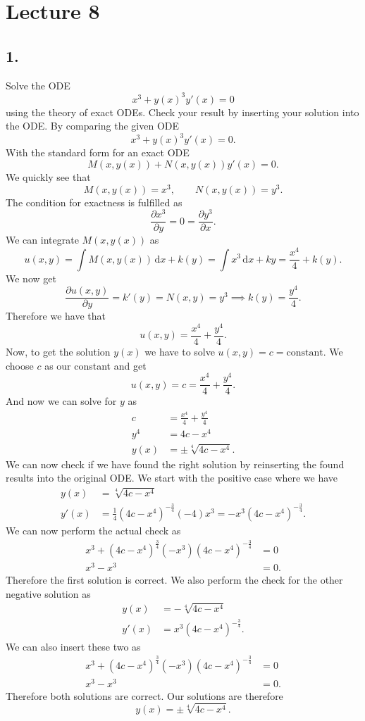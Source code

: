 \section*{Lecture 8}

\subsection*{1.} Solve the ODE
\[ 
x^3 + y(x)^3y'(x) = 0
\]
using the theory of exact ODEs. Check your result by inserting your solution into the ODE.
\bigbreak
By comparing the given ODE
\[ 
x^3 + y(x)^3 y'(x) = 0
.\]
With the standard form for an exact ODE
\[ 
M(x, y(x)) + N(x, y(x))y'(x) = 0
.\]
We quickly see that
\[ 
M(x, y(x)) = x^3, \qquad N(x, y(x)) = y^3
.\]
The condition for exactness is fulfilled as
\[ 
\frac{\partial x^3}{\partial y} = 0 = \frac{\partial y^3}{\partial x}
.\]
We can integrate $M(x, y(x))$ as
\[ 
u(x,y) = \int M(x, y(x)) \, \mathrm{d}x + k(y) = \int x^3 \, \mathrm{d}x + ky = \frac{x^{4}}{4} + k(y)
.\]
We now get
\[ 
\frac{\partial u(x,y)}{\partial y} = k'(y) = N(x,y) = y^3 \implies k(y) = \frac{y^{4}}{4}
.\]
Therefore we have that
\[ 
u(x,y) = \frac{x^{4}}{4} + \frac{y^{4}}{4}
.\]
Now, to get the solution $y(x)$ we have to solve $u(x,y) = c = \mathrm{constant}$. We choose $c$ as our constant and get
\[ 
u(x,y) = c = \frac{x^{4}}{4} + \frac{y^{4}}{4}
.\]
And now we can solve for $y$ as
\begin{align*}
  c &= \frac{x^{4}}{4} + \frac{y^{4}}{4} \\
  y^{4} &= 4c - x^{4} \\
  y(x) &= \pm \sqrt[4]{4c - x^{4}}
.\end{align*}
We can now check if we have found the right solution by reinserting the found results into the original ODE. We start with the positive case where we have
\begin{align*}
  y(x) &= \sqrt[4]{4c - x^{4}} \\
  y'(x) &= \frac{1}{4} \left( 4c - x^{4} \right)^{-\frac{3}{4}} (-4)x^3 = -x^3 \left( 4c - x^{4} \right)^{-\frac{3}{4}}
.\end{align*}
We can now perform the actual check as
\begin{align*}
  x^3 + \left( 4c - x^{4} \right)^{\frac{3}{4}} \left( -x^3 \right) \left( 4c - x^{4} \right)^{-\frac{3}{4}} &= 0 \\
  x^3 - x^3 &= 0
.\end{align*}
Therefore the first solution is correct. We also perform the check for the other negative solution as
\begin{align*}
  y(x) &= -\sqrt[4]{4c - x^{4}} \\
  y'(x) &= x^3 \left( 4c - x^{4} \right)^{-\frac{3}{4}}
.\end{align*}
We can also insert these two as
\begin{align*}
  x^3 + \left( 4c - x^{4} \right)^{\frac{3}{4}} \left( -x^3 \right) \left( 4c - x^{4} \right)^{-\frac{3}{4}} &= 0 \\
  x^3 - x^3 &= 0
.\end{align*}
Therefore both solutions are correct. Our solutions are therefore
\[ 
  y(x) = \pm \sqrt[4]{4c - x^{4}}
.\]


